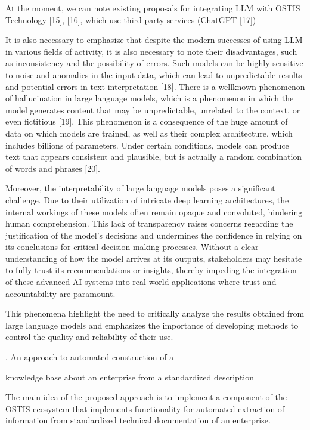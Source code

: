 \documentclass{article}
\begin{document}
\begin{SCn}
\begin{multicols}
At the moment, we can note existing proposals for
integrating LLM with OSTIS Technology [15], [16],
which use third-party services (ChatGPT [17])

It is also necessary to emphasize that despite the modern successes of using LLM in various fields of activity,
it is also necessary to note their disadvantages, such as
inconsistency and the possibility of errors. Such models
can be highly sensitive to noise and anomalies in the
input data, which can lead to unpredictable results and
potential errors in text interpretation [18]. There is a wellknown phenomenon of hallucination in large language
models, which is a phenomenon in which the model
generates content that may be unpredictable, unrelated to
the context, or even fictitious [19]. This phenomenon is a consequence of the huge amount of data on which models
are trained, as well as their complex architecture, which
includes billions of parameters. Under certain conditions,
models can produce text that appears consistent and
plausible, but is actually a random combination of words
and phrases [20].

Moreover, the interpretability of large language models
poses a significant challenge. Due to their utilization of
intricate deep learning architectures, the internal workings of these models often remain opaque and convoluted, hindering human comprehension. This lack of
transparency raises concerns regarding the justification
of the model’s decisions and undermines the confidence
in relying on its conclusions for critical decision-making
processes. Without a clear understanding of how the
model arrives at its outputs, stakeholders may hesitate
to fully trust its recommendations or insights, thereby
impeding the integration of these advanced AI systems
into real-world applications where trust and accountability are paramount.

This phenomena highlight the need to critically analyze the results obtained from large language models
and emphasizes the importance of developing methods
to control the quality and reliability of their use.
\begin{center}
    {\MakeUppercase{.}}
    An approach to automated construction of a
    
knowledge base about an enterprise from a standardized
description
\end{center}

The main idea of the proposed approach is to implement a component of the OSTIS ecosystem that
implements functionality for automated extraction of
information from standardized technical documentation
of an enterprise.


\end{multicols}
\end{SCn}
\end{document}
